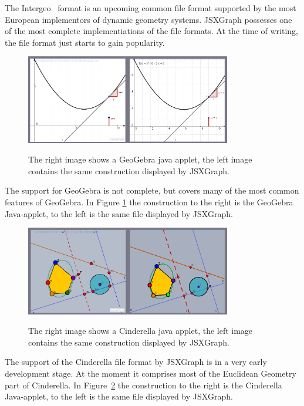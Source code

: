 \documentclass[12pt,a4paper]{article}%
\begin{document}
The Intergeo~\cite{kortenkamp2009} format is an upcoming common file format supported by the most European implementors of dynamic geometry systems. JSXGraph possesses one of the most complete  implementiations of the file formats. At the time of writing, the file format just starts to gain popularity. 

\begin{figure}[ht]
\begin{center}
\includegraphics[width=0.8\textwidth]{geogebra.png}\\
\caption{The right image shows a GeoGebra java applet, 
the left image contains the same construction displayed 
by JSXGraph.}\label{fig:geogebra}
\end{center}
\end{figure}
The support for GeoGebra is not complete, but covers many of the most common features of  GeoGebra. In Figure \ref{fig:geogebra} the construction to the right is the GeoGebra Java-applet, to the left is the same file displayed by JSXGraph.


\begin{figure}[ht]
\begin{center}
\includegraphics[width=0.8\textwidth]{cindy.png}\\
\caption{The right image shows a Cinderella java applet, 
the left image contains the same construction displayed 
by JSXGraph.}\label{fig:cindy}
\end{center}
\end{figure}
The support of the Cinderella file format \cite{kortenkamp1999} by JSXGraph is in a very early development stage. At the moment it comprises most of the Euclidean Geometry part of Cinderella. In Figure~\ref{fig:cindy} the construction to the right is the Cinderella Java-applet, to the left is the same file displayed by JSXGraph.
\end{document}
